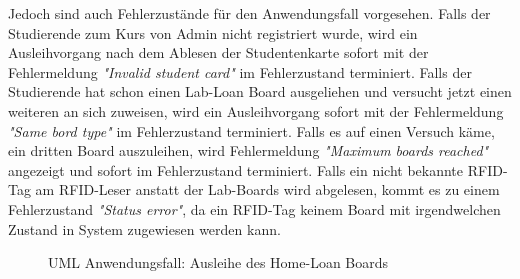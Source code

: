 Jedoch sind auch Fehlerzustände für den Anwendungsfall vorgesehen. Falls der Studierende zum Kurs von Admin nicht registriert wurde, wird ein Ausleihvorgang nach dem Ablesen der Studentenkarte sofort mit der Fehlermeldung \textit{"Invalid student card"} im Fehlerzustand terminiert. Falls der Studierende hat schon einen Lab-Loan Board ausgeliehen und versucht jetzt einen weiteren an sich zuweisen, wird ein Ausleihvorgang sofort mit der Fehlermeldung \textit{"Same bord type"} im Fehlerzustand terminiert. Falls es auf einen Versuch käme, ein dritten Board auszuleihen, wird Fehlermeldung \textit{"Maximum boards reached"} angezeigt und sofort im Fehlerzustand terminiert. Falls ein nicht bekannte RFID-Tag am RFID-Leser anstatt der Lab-Boards wird abgelesen, kommt es zu einem Fehlerzustand \textit{"Status error"}, da ein RFID-Tag keinem Board mit irgendwelchen Zustand in System zugewiesen werden kann. 

\begin{figure}
	\centering
	\caption{UML Anwendungsfall: Ausleihe des Home-Loan Boards}
	\label{fig:use_home_loan}
\end{figure}

